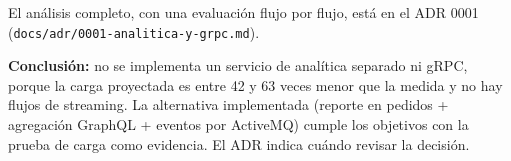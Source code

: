 El análisis completo, con una evaluación flujo por flujo, está en el ADR 0001 (\texttt{docs/\allowbreak{}adr/\allowbreak{}0001-\allowbreak{}analitica-\allowbreak{}y-\allowbreak{}grpc.\allowbreak{}md}).


\textbf{Conclusión:} no se implementa un servicio de analítica separado ni gRPC, porque la carga proyectada es entre 42 y 63 veces menor que la medida y no hay flujos de streaming. La alternativa implementada (reporte en pedidos + agregación GraphQL + eventos por ActiveMQ) cumple los objetivos con la prueba de carga como evidencia. El ADR indica cuándo revisar la decisión.

